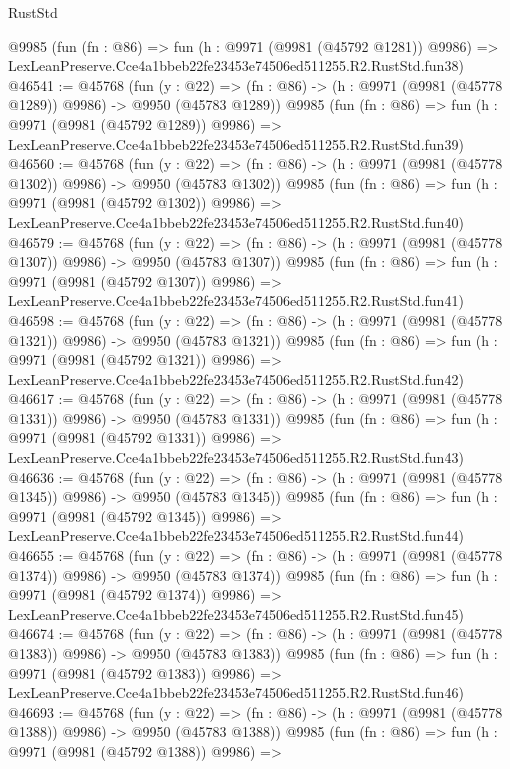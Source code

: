 \begin{lexlean}{RustStd}
\begin{coremodule}
    @9985
    (fun (fn : @86) =>
    fun (h : @9971 (@9981 (@45792 @1281)) @9986) =>
    LexLeanPreserve.Cce4a1bbeb22fe23453e74506ed511255.R2.RustStd.fun38)
@46541 := @45768
    (fun (y : @22) =>
    (fn : @86) -> (h : @9971 (@9981 (@45778 @1289)) @9986) -> @9950 (@45783 @1289))
    @9985
    (fun (fn : @86) =>
    fun (h : @9971 (@9981 (@45792 @1289)) @9986) =>
    LexLeanPreserve.Cce4a1bbeb22fe23453e74506ed511255.R2.RustStd.fun39)
@46560 := @45768
    (fun (y : @22) =>
    (fn : @86) -> (h : @9971 (@9981 (@45778 @1302)) @9986) -> @9950 (@45783 @1302))
    @9985
    (fun (fn : @86) =>
    fun (h : @9971 (@9981 (@45792 @1302)) @9986) =>
    LexLeanPreserve.Cce4a1bbeb22fe23453e74506ed511255.R2.RustStd.fun40)
@46579 := @45768
    (fun (y : @22) =>
    (fn : @86) -> (h : @9971 (@9981 (@45778 @1307)) @9986) -> @9950 (@45783 @1307))
    @9985
    (fun (fn : @86) =>
    fun (h : @9971 (@9981 (@45792 @1307)) @9986) =>
    LexLeanPreserve.Cce4a1bbeb22fe23453e74506ed511255.R2.RustStd.fun41)
@46598 := @45768
    (fun (y : @22) =>
    (fn : @86) -> (h : @9971 (@9981 (@45778 @1321)) @9986) -> @9950 (@45783 @1321))
    @9985
    (fun (fn : @86) =>
    fun (h : @9971 (@9981 (@45792 @1321)) @9986) =>
    LexLeanPreserve.Cce4a1bbeb22fe23453e74506ed511255.R2.RustStd.fun42)
@46617 := @45768
    (fun (y : @22) =>
    (fn : @86) -> (h : @9971 (@9981 (@45778 @1331)) @9986) -> @9950 (@45783 @1331))
    @9985
    (fun (fn : @86) =>
    fun (h : @9971 (@9981 (@45792 @1331)) @9986) =>
    LexLeanPreserve.Cce4a1bbeb22fe23453e74506ed511255.R2.RustStd.fun43)
@46636 := @45768
    (fun (y : @22) =>
    (fn : @86) -> (h : @9971 (@9981 (@45778 @1345)) @9986) -> @9950 (@45783 @1345))
    @9985
    (fun (fn : @86) =>
    fun (h : @9971 (@9981 (@45792 @1345)) @9986) =>
    LexLeanPreserve.Cce4a1bbeb22fe23453e74506ed511255.R2.RustStd.fun44)
@46655 := @45768
    (fun (y : @22) =>
    (fn : @86) -> (h : @9971 (@9981 (@45778 @1374)) @9986) -> @9950 (@45783 @1374))
    @9985
    (fun (fn : @86) =>
    fun (h : @9971 (@9981 (@45792 @1374)) @9986) =>
    LexLeanPreserve.Cce4a1bbeb22fe23453e74506ed511255.R2.RustStd.fun45)
@46674 := @45768
    (fun (y : @22) =>
    (fn : @86) -> (h : @9971 (@9981 (@45778 @1383)) @9986) -> @9950 (@45783 @1383))
    @9985
    (fun (fn : @86) =>
    fun (h : @9971 (@9981 (@45792 @1383)) @9986) =>
    LexLeanPreserve.Cce4a1bbeb22fe23453e74506ed511255.R2.RustStd.fun46)
@46693 := @45768
    (fun (y : @22) =>
    (fn : @86) -> (h : @9971 (@9981 (@45778 @1388)) @9986) -> @9950 (@45783 @1388))
    @9985
    (fun (fn : @86) =>
    fun (h : @9971 (@9981 (@45792 @1388)) @9986) =>

\end{coremodule}
\end{lexlean}
